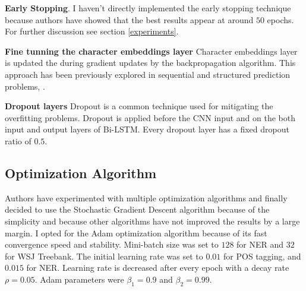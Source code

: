 \textbf{Early Stopping}. I haven't directly implemented the early stopping
technique\cite{caruana2000overfitting} because authors have showed that the best results
appear at around $50$ epochs. For further discussion see section
\ref{experiments}.

\textbf{Fine tunning the character embeddings layer}
Character embeddings layer is updated the during gradient updates by the
backpropagation algorithm. This approach has been previously explored in
sequential and structured prediction problems\cite{collobert2011natural},
\cite{peng2015named}.

\textbf{Dropout layers}
Dropout is a common technique used for mitigating the overfitting problems.
Dropout is applied before the CNN input and on the both input and output
layers of Bi-LSTM. Every dropout layer has a fixed dropout ratio of $0.5$.

\subsection{Optimization Algorithm}
Authors have experimented with multiple optimization algorithms and finally
decided to use the Stochastic Gradient Descent algorithm because of
the simplicity and because other algorithms have not improved the results by a
large margin. I opted for the Adam optimization algorithm\cite{kingma2014adam} because of
its fast convergence speed and stability. Mini-batch size was set to $128$ for
NER and $32$ for WSJ Treebank. The initial learning rate was set to $0.01$ for
POS tagging, and $0.015$ for NER. Learning rate is decreased after every epoch
with a decay rate $\rho = 0.05$. Adam parameters were $\beta_1 = 0.9$ and
$\beta_2 = 0.99$.

